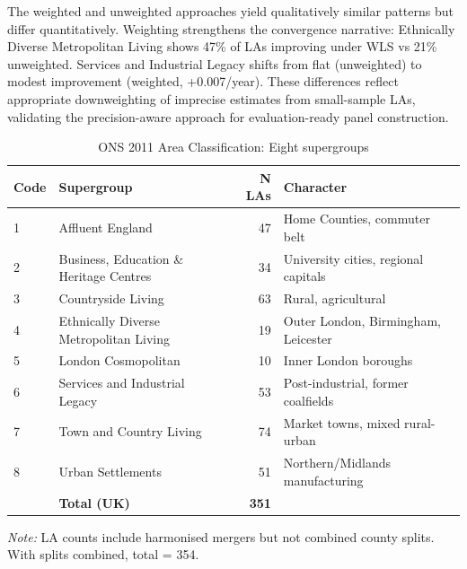 \documentclass[12pt,a4paper]{article}
\begin{document}
The weighted and unweighted approaches yield qualitatively similar patterns but differ quantitatively. Weighting strengthens the convergence narrative: Ethnically Diverse Metropolitan Living shows 47\% of LAs improving under WLS vs 21\% unweighted. Services and Industrial Legacy shifts from flat (unweighted) to modest improvement (weighted, +0.007/year). These differences reflect appropriate downweighting of imprecise estimates from small-sample LAs, validating the precision-aware approach for evaluation-ready panel construction.


\begin{table}[H]
\centering
\caption{ONS 2011 Area Classification: Eight supergroups}
\label{tab:supergroups}
\small
\begin{tabular}{llrl}
\toprule
Code & Supergroup & N LAs & Character \\
\midrule
1 & Affluent England & 47 & Home Counties, commuter belt \\
2 & Business, Education \& Heritage Centres & 34 & University cities, regional capitals \\
3 & Countryside Living & 63 & Rural, agricultural \\
4 & Ethnically Diverse Metropolitan Living & 19 & Outer London, Birmingham, Leicester \\
5 & London Cosmopolitan & 10 & Inner London boroughs \\
6 & Services and Industrial Legacy & 53 & Post-industrial, former coalfields \\
7 & Town and Country Living & 74 & Market towns, mixed rural-urban \\
8 & Urban Settlements & 51 & Northern/Midlands manufacturing \\
\midrule
& \textbf{Total (UK)} & \textbf{351} & \\
\bottomrule
\end{tabular}
\begin{flushleft}
\small\textit{Note:} LA counts include harmonised mergers but not combined county splits. With splits combined, total = 354.
\end{flushleft}
\end{table}
\end{document}
